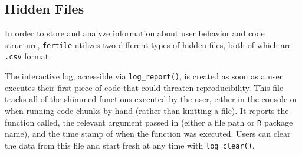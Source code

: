 \documentclass[12pt,twoside]{reedthesis}
\begin{document}
\subsection{Hidden Files}\label{hidden-files}

In order to store and analyze information about user behavior and code
structure, \texttt{fertile} utilizes two different types of hidden
files, both of which are \texttt{.csv} format.

The interactive log, accessible via \texttt{log\_report()}, is created
as soon as a user executes their first piece of code that could threaten
reproducibility. This file tracks all of the shimmed functions executed
by the user, either in the console or when running code chunks by hand
(rather than knitting a file). It reports the function called, the
relevant argument passed in (either a file path or \texttt{R} package
name), and the time stamp of when the function was executed. Users can
clear the data from this file and start fresh at any time with
\texttt{log\_clear()}.
\end{document}
